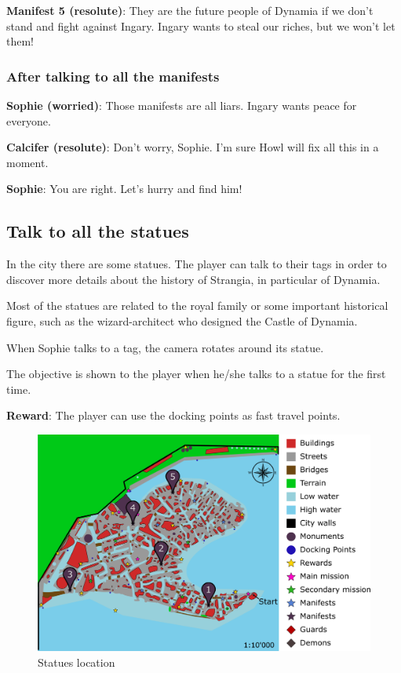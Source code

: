 \textbf{Manifest 5 (resolute)}: They are the future people of Dynamia if we don't stand and fight against Ingary. Ingary wants to steal our riches, but we won't let them!

\subsubsection*{After talking to all the manifests}
\textbf{Sophie (worried)}: Those manifests are all liars. Ingary wants peace for everyone.

\textbf{Calcifer (resolute)}: Don't worry, Sophie. I'm sure Howl will fix all this in a moment.

\textbf{Sophie}: You are right. Let's hurry and find him!


\subsection{Talk to all the statues}
In the city there are some statues. The player can talk to their tags in order to discover more details about the history of Strangia, in particular of Dynamia.

Most of the statues are related to the royal family or some important historical figure, such as the wizard-architect who designed the Castle of Dynamia.

When Sophie talks to a tag, the camera rotates around its statue.

The objective is shown to the player when he/she talks to a statue for the first time.

\textbf{Reward}: The player can use the docking points as fast travel points.



\begin{figure}[H]
  \centering
  \includegraphics[width=\textwidth]{../Images/Maps/dynamiaSecondaryMissions_Statues}
  \caption{Statues location}
\end{figure}

